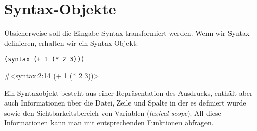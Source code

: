 %   
% 

%   


\section{Syntax-Objekte}
Übsicherweise soll die Eingabe-Syntax transformiert werden. Wenn wir Syntax definieren, erhalten wir ein Syntax-Objekt:

\begin{lstlisting}
(syntax (+ 1 (* 2 3)))
\end{lstlisting}
{\routput\#<syntax:2:14 (+ 1 (* 2 3))>}

Ein Syntaxobjekt besteht aus einer Repräsentation des Ausdrucks, enthält aber auch Informationen über die Datei, Zeile und Spalte in der es definiert wurde sowie den Sichtbarkeitsbereich von Variablen (\emph{lexical scope}). All diese Informationen kann man mit entsprechenden Funktionen abfragen.%
% 
% 
% 
% 
% 
% 

